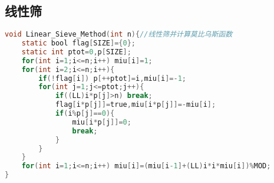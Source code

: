 \subsection{线性筛}
\begin{lstlisting}[language=C]
void Linear_Sieve_Method(int n){//线性筛并计算莫比乌斯函数
	static bool flag[SIZE]={0};
	static int ptot=0,p[SIZE];
	for(int i=1;i<=n;i++) miu[i]=1;
	for(int i=2;i<=n;i++){
		if(!flag[i]) p[++ptot]=i,miu[i]=-1;
		for(int j=1;j<=ptot;j++){
			if((LL)i*p[j]>n) break;
			flag[i*p[j]]=true,miu[i*p[j]]=-miu[i];
			if(i%p[j]==0){
				miu[i*p[j]]=0;
				break;
			}
		}
	}
	for(int i=1;i<=n;i++) miu[i]=(miu[i-1]+(LL)i*i*miu[i])%MOD;
}
\end{lstlisting} 
